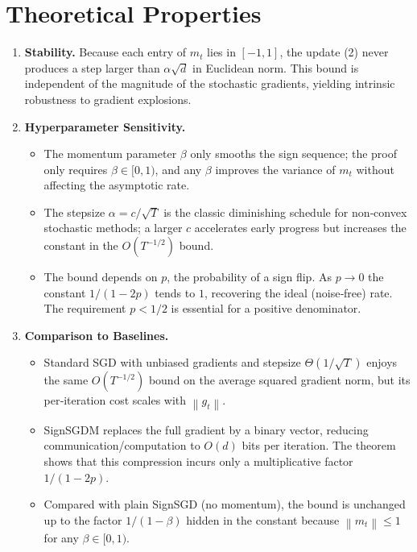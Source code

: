 \documentclass[11pt]{article}
\newcommand{\norm}[1]{\left\lVert#1\right\rVert}
\begin{document}
\section*{Theoretical Properties}
\begin{enumerate}[label=\arabic*.]
\item \textbf{Stability.} Because each entry of $m_{t}$ lies in $[-1,1]$, the update (2) never produces a step larger than $\alpha\sqrt{d}$ in Euclidean norm. This bound is independent of the magnitude of the stochastic gradients, yielding intrinsic robustness to gradient explosions.
\item \textbf{Hyperparameter Sensitivity.}
    \begin{itemize}
    \item The momentum parameter $\beta$ only smooths the sign sequence; the proof only requires $\beta\in[0,1)$, and any $\beta$ improves the variance of $m_{t}$ without affecting the asymptotic rate.
    \item The stepsize $\alpha=c/\sqrt{T}$ is the classic diminishing schedule for non‑convex stochastic methods; a larger $c$ accelerates early progress but increases the constant in the $O(T^{-1/2})$ bound.
    \item The bound depends on $p$, the probability of a sign flip. As $p\to 0$ the constant $1/(1-2p)$ tends to $1$, recovering the ideal (noise‑free) rate. The requirement $p<1/2$ is essential for a positive denominator.
    \end{itemize}
\item \textbf{Comparison to Baselines.}
    \begin{itemize}
    \item Standard SGD with unbiased gradients and stepsize $\Theta(1/\sqrt{T})$ enjoys the same $O(T^{-1/2})$ bound on the average squared gradient norm, but its per‑iteration cost scales with $\norm{g_{t}}$.
    \item SignSGDM replaces the full gradient by a binary vector, reducing communication/computation to $O(d)$ bits per iteration. The theorem shows that this compression incurs only a multiplicative factor $1/(1-2p)$.
    \item Compared with plain SignSGD (no momentum), the bound is unchanged up to the factor $1/(1-\beta)$ hidden in the constant because $\norm{m_{t}}\le 1$ for any $\beta\in[0,1)$.
    \end{itemize}
\end{enumerate}

\end{document}

